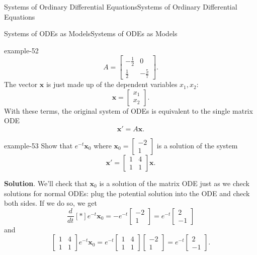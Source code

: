 \documentclass[10pt,]{book}
\numberwithin{equation}{section}
\renewcommand{\vec}[1]{\mathbf{#1}}
\newcommand{\dv}[3][]{\dfrac{d^{#1} #2}{d #3^{#1}}}
\newcommand{\brackets}[1]{\left[ #1 \right]}
\newcommand{\amp}{&}
\begin{document}
\begin{chapterptx}{Systems of Ordinary Differential Equations}{}{Systems of Ordinary Differential Equations}{}{}
\begin{sectionptx}{Systems of ODEs as Models}{}{Systems of ODEs as Models}{}{}
\begin{example}{}{example-52}
\begin{equation*}
A = \begin{bmatrix}-\frac{1}{2}\amp 0\\\frac{1}{2}\amp -\frac{5}{7}\end{bmatrix}.
\end{equation*}
The vector \(\vec{x}\) is just made up of the dependent variables \(x_{1},x_{2}\):%
\begin{equation*}
\vec{x} = \begin{bmatrix}x_{1}\\x_{2}\end{bmatrix}.
\end{equation*}
With these terms, the original system of ODEs is equivalent to the single matrix ODE%
\begin{equation*}
\vec{x}' = A\vec{x}.
\end{equation*}
%
\end{example}
\begin{example}{}{example-53}%
\hypertarget{p-319}{}%
Show that \(e^{-t}\vec{x}_{0}\) where \(\vec{x}_{0} = \begin{bmatrix}-2\\1\end{bmatrix}\) is a solution of the system%
\begin{equation*}
\vec{x}' = \begin{bmatrix}1\amp 4\\1\amp 1\end{bmatrix}\vec{x}.
\end{equation*}
%
\par\smallskip%
\noindent\textbf{Solution}.\hypertarget{solution-50}{}\quad%
\hypertarget{p-320}{}%
We'll check that \(\vec{x}_{0}\) is a solution of the matrix ODE just as we check solutions for normal ODEs: plug the potential solution into the ODE and check both sides. If we do so, we get%
\begin{equation*}
\dv{}{t}\brackets*{e^{-t}\vec{x}_{0}} = -e^{-t}\begin{bmatrix}-2\\1\end{bmatrix} = e^{-t}\begin{bmatrix}2\\-1\end{bmatrix}
\end{equation*}
and%
\begin{equation*}
\begin{bmatrix}1\amp 4\\1\amp 1\end{bmatrix}e^{-t}\vec{x}_{0} = e^{-t}\begin{bmatrix}1\amp 4\\1\amp 1\end{bmatrix}\begin{bmatrix}-2\\1\end{bmatrix} = e^{-t}\begin{bmatrix}2\\-1\end{bmatrix}.

\end{equation*}
\end{example}
\end{sectionptx}
\end{chapterptx}
\end{document}
